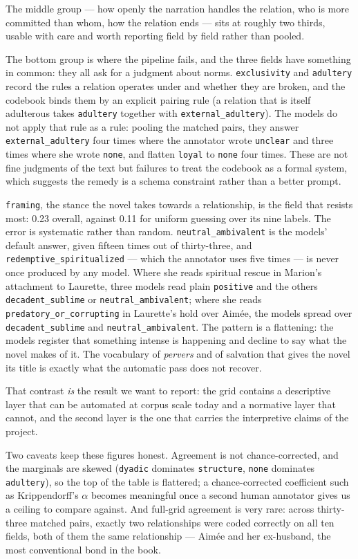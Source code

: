 The middle group --- how openly the narration handles the relation, who is more
committed than whom, how the relation ends --- sits at roughly two thirds, usable
with care and worth reporting field by field rather than pooled.

The bottom group is where the pipeline fails, and the three fields have something in
common: they all ask for a judgment about norms. \texttt{exclusivity} and
\texttt{adultery} record the rules a relation operates under and whether they are
broken, and the codebook binds them by an explicit pairing rule (a relation that is
itself adulterous takes \texttt{adultery} together with \texttt{external\_adultery}).
The models do not apply that rule as a rule: pooling the matched pairs, they answer
\texttt{external\_adultery} four times where the annotator wrote \texttt{unclear} and
three times where she wrote \texttt{none}, and flatten \texttt{loyal} to \texttt{none}
four times. These are not fine judgments of the text but failures to treat the
codebook as a formal system, which suggests the remedy is a schema constraint rather
than a better prompt.

\texttt{framing}, the stance the novel takes towards a relationship, is the field
that resists most: 0.23 overall, against 0.11 for uniform guessing over its nine
labels. The error is systematic rather than random. \texttt{neutral\_ambivalent} is
the models' default answer, given fifteen times out of thirty-three, and
\texttt{redemptive\_spiritualized} --- which the annotator uses five times --- is
never once produced by any model. Where she reads spiritual rescue in Marion's
attachment to Laurette, three models read plain \texttt{positive} and the others
\texttt{decadent\_sublime} or \texttt{neutral\_ambivalent}; where she reads
\texttt{predatory\_or\_corrupting} in Laurette's hold over Aimée, the models spread
over \texttt{decadent\_sublime} and \texttt{neutral\_ambivalent}. The pattern is a
flattening: the models register that something intense is happening and decline to
say what the novel makes of it. The vocabulary of \emph{pervers} and of salvation
that gives the novel its title is exactly what the automatic pass does not recover.

That contrast \emph{is} the result we want to report: the grid contains a descriptive
layer that can be automated at corpus scale today and a normative layer that cannot,
and the second layer is the one that carries the interpretive claims of the project.

Two caveats keep these figures honest. Agreement is not chance-corrected, and the
marginals are skewed (\texttt{dyadic} dominates \texttt{structure}, \texttt{none}
dominates \texttt{adultery}), so the top of the table is flattered; a chance-corrected
coefficient such as Krippendorff's $\alpha$ \cite{krippendorff2004content} becomes
meaningful once a second human annotator gives us a ceiling to compare against. And
full-grid agreement is very rare: across thirty-three matched pairs, exactly two
relationships were coded correctly on all ten fields, both of them the same
relationship --- Aimée and her ex-husband, the most conventional bond in the book.

